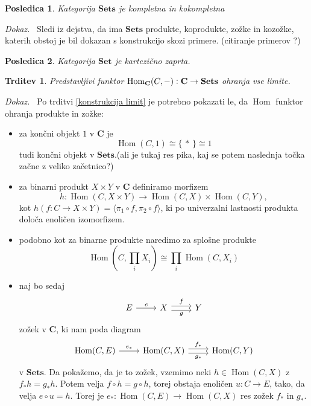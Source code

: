 \documentclass[12pt,a4paper]{book}
\theoremstyle{definition}
\theoremstyle{plain}
\newtheorem{trditev}[definicija]{Trditev}
\newtheorem{posledica}{Posledica}[definicija]
\newenvironment{dokaz}{\emph{Dokaz.}\ }{\hspace{\fill}{$\Box$}}
\theoremstyle{definition}
\theoremstyle{remark}
\newcommand{\cat}[1]{\textbf{#1}}
\DeclareMathOperator{\Hom}{Hom}
\renewcommand{\set}[1]{\{\,#1\,\}}
\begin{document}
\begin{posledica}
Kategorija $\cat{Sets}$ je kompletna in kokompletna
\end{posledica}
\begin{dokaz}
Sledi iz dejstva, da ima $\cat{Sets}$ produkte, koprodukte, zožke in kozožke, katerih obstoj je bil dokazan s konstrukcijo skozi primere. (citiranje primerov ?)
\end{dokaz}

\begin{posledica}
Kategorija $\cat{Set}$ je kartezično zaprta.
\end{posledica}

 
\begin{trditev} Predstavljivi funktor $\Hom_{\bf{C}}(C,-): \bf{C} \to \bf{Sets}$ ohranja vse limite.
\end{trditev}
\begin{dokaz}
Po trditvi \ref{konstrukcija limit} je potrebno pokazati le, da $\Hom$ funktor ohranja produkte in zožke:

\begin{itemize}
\item za končni objekt $1$ v $\cat{C}$ je 
$$\Hom(C,1) \cong \set{*} \cong 1$$
tudi končni objekt v $\cat{Sets}.$(ali je tukaj res pika, kaj se potem naslednja točka začne z veliko začetnico?)
\item za binarni produkt $X \times Y$ v $\cat{C}$ definiramo morfizem 
$$h : \Hom(C, X \times Y) \to \Hom(C,X) \times \Hom(C,Y),$$
kot $h(f : C \to X \times Y) = \langle \pi_1 \circ f, \pi_2 \circ f \rangle$, ki po univerzalni lastnosti produkta določa enoličen izomorfizem.
\item podobno kot za binarne produkte naredimo za splošne produkte
$$\Hom(C, \prod_i X_i) \cong \prod_i \Hom(C, X_i)$$
\item naj bo sedaj
$$ \begin{tikzcd}[sep=normal]
E \ar[r, "e"] & X \ar[r, shift left, "f"] \ar[r, shift right, "g"'] & Y
\end{tikzcd} $$
zožek v $\cat{C}$, ki nam poda diagram
$$ \begin{tikzcd}[sep=normal]
\Hom(C,E) \ar[r, "e_*"] & \Hom(C,X) \ar[r, shift left, "f_*"] \ar[r, shift right, "g_*"'] & \Hom(C,Y)
\end{tikzcd} $$
v $\cat{Sets}$. Da pokažemo, da je to zožek, vzemimo neki $h \in \Hom(C,X)$ z $f_* h = g_* h$. Potem velja $f \circ h = g \circ h$, torej obstaja enoličen $u : C \to E$, tako, da velja $e \circ u = h$. Torej je $e_* : \Hom(C,E) \to \Hom(C,X)$ res zožek $f_*$ in $g_*$.
\end{itemize}

\end{dokaz}
\end{document}
